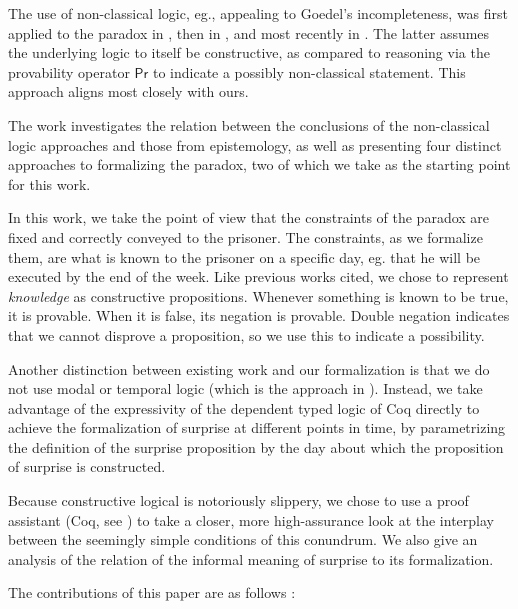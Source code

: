 \documentclass[journal]{journal}
\begin{document}
The use of non-classical logic,
eg., appealing to Goedel's incompleteness, was first applied to the
paradox in \cite{goedelized}, then in \cite{godelinconsistent}, and most recently
in \cite{constructive}. The latter assumes the underlying logic to itself be
constructive, as compared to reasoning via the provability operator $\mathsf{Pr}$ to indicate
a possibly non-classical statement. This approach aligns most closely with ours.

The work \cite{fourpossible} investigates the relation between the conclusions
of the non-classical logic approaches and those from epistemology, as well
as presenting four distinct approaches to formalizing the paradox, two of which
we take as the starting point for this work.

In this work, we take the point of view that the constraints of the paradox are
fixed and correctly conveyed to the prisoner. The constraints, as we formalize them,
are what is known to the prisoner on a specific day, eg. that he will be executed
by the end of the week. Like previous works cited, we chose to represent
\emph{knowledge} as constructive propositions. Whenever something is known to be
true, it is provable. When it is false, its negation is provable. Double negation
indicates that we cannot disprove a proposition, so we use this to indicate a
possibility.

Another distinction between existing work and our formalization is that
we do not use modal or temporal logic (which is the approach in \cite{modalepistemic}).
Instead, we take advantage of the expressivity of the dependent typed logic of Coq directly to
achieve the formalization of surprise at different points in time,
by parametrizing the definition of the surprise proposition
by the day about which the proposition of surprise is constructed.

Because constructive logical is notoriously slippery, we chose to use a proof
assistant (Coq, see \cite{coqmanual}) to take a closer, more high-assurance look at the
interplay between the seemingly simple conditions of this conundrum.
We also give an analysis of the relation of the informal meaning of surprise
to its formalization.

The contributions of this paper are as follows :
\end{document}
